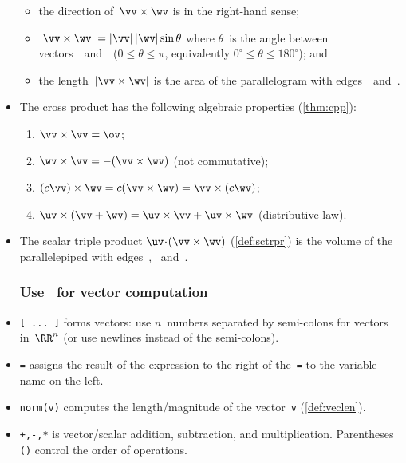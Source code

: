 \begin{itemize}
\begin{itemize}
\item the direction of~\(\vv\times\wv\) is in the right-hand sense; 

\item \(|\vv\times\wv|=|\vv|\,|\wv|\sin\theta\) where \(\theta\)~is the {angle} between vectors~\vv\ and~\wv\ (\(0\leq\theta\leq\pi\), equivalently \(0^\circ\leq\theta\leq180^\circ\)); and

\item the {length}~\(|\vv\times\wv|\) is the {area} of the parallelogram with edges~\vv\ and~\wv.
\end{itemize}

\item The cross product has the following algebraic properties (\autoref{thm:cpp}):
\begin{enumerate}
\item \(\vv\times\vv=\ov\);
\item \(\wv\times\vv=-(\vv\times\wv)\) \quad(not commutative);
\item \((c\vv)\times\wv=c(\vv\times\wv)=\vv\times(c\wv)\);
\item \(\uv\times(\vv+\wv)=\uv\times\vv+\uv\times\wv\) \quad({distributive law}).
\end{enumerate}

\item The {scalar triple product} \(\uv\cdot(\vv\times\wv)\) (\autoref{def:sctrpr}) is the volume of the parallelepiped with edges~\uv, \vv\ and~\wv.





\subsubsection{Use \script\ for vector computation}

\item \verb|[ ... ]| forms vectors: use \(n\)~numbers separated by semi-colons for vectors in~\(\RR^n\) (or use newlines instead of the semi-colons).  

\item \verb|=| assigns the result of the expression to the right of the~\verb|=| to the variable name on the left.

\item \verb|norm(v)| computes the {length}\slash {magnitude} of the vector~\verb|v| (\autoref{def:veclen}).

\item \verb|+,-,*| is vector\slash scalar addition, subtraction, and multiplication.
Parentheses \verb|()| control the order of operations.


\end{itemize}
